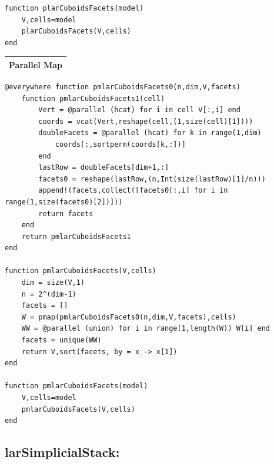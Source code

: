 \documentclass{article}
\begin{document}
\begin{flushleft}
\begin{list}{}{}
\begin{Verbatim}[tabsize=4]
function plarCuboidsFacets(model)
    V,cells=model
    plarCuboidsFacets(V,cells)
end
   \end{Verbatim}
\end{list}
\vspace{2ex}
\newpage
\begin{center}
\begin{tabular}{|p{16cm}|}
\hline
\cellcolor[gray]{.9}Parallel Map\\
\hline
\end{tabular}
\end{center}
\vspace{2ex}
\begin{list}{}{} \item
   \begin{Verbatim}[tabsize=4]
@everywhere function pmlarCuboidsFacets0(n,dim,V,facets)
	function pmlarCuboidsFacets1(cell)
		Vert = @parallel (hcat) for i in cell V[:,i] end
		coords = vcat(Vert,reshape(cell,(1,size(cell)[1])))
		doubleFacets = @parallel (hcat) for k in range(1,dim) 
		    coords[:,sortperm(coords[k,:])] 
		end
		lastRow = doubleFacets[dim+1,:]
		facets0 = reshape(lastRow,(n,Int(size(lastRow)[1]/n)))
		append!(facets,collect([facets0[:,i] for i in range(1,size(facets0)[2])]))
		return facets
	end
	return pmlarCuboidsFacets1
end

function pmlarCuboidsFacets(V,cells)
	dim = size(V,1)
	n = 2^(dim-1)
	facets = []
	W = pmap(pmlarCuboidsFacets0(n,dim,V,facets),cells)
	WW = @parallel (union) for i in range(1,length(W)) W[i] end
	facets = unique(WW)
	return V,sort(facets, by = x -> x[1])
end

function pmlarCuboidsFacets(model)
    V,cells=model
    pmlarCuboidsFacets(V,cells)
end
   \end{Verbatim}
\end{list}

\vspace{2ex}
\footnotesize\addtolength{\baselineskip}{-1ex}
\end{flushleft}

\subsection{larSimplicialStack:}
\vspace{1ex}
\end{document}

